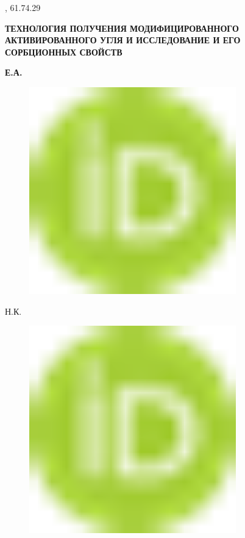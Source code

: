 , 61.74.29

{\bfseries ТЕХНОЛОГИЯ ПОЛУЧЕНИЯ МОДИФИЦИРОВАННОГО АКТИВИРОВАННОГО УГЛЯ И
ИССЛЕДОВАНИЕ И ЕГО СОРБЦИОННЫХ СВОЙСТВ}

{\bfseries Е.А.
\begin{figure}[H]
	\centering
	\includegraphics[width=0.8\textwidth]{media/chem/image1}
	\caption*{}
\end{figure}

Н.К.
\begin{figure}[H]
	\centering
	\includegraphics[width=0.8\textwidth]{media/chem/image1}
	\caption*{}
\end{figure}

}
